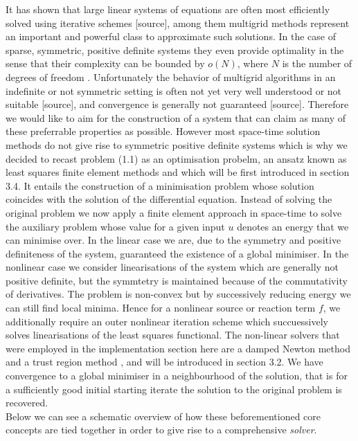 \documentclass[../draft_1.tex]{subfiles}
\begin{document}
It has shown that large linear systems of equations are often most efficiently solved using iterative schemes [source], among them multigrid methods represent an important and powerful class to approximate such solutions. In the case of sparse, symmetric, positive definite systems they even provide optimality in the sense that their complexity can be bounded by $o(N)$, where $N$ is the number of degrees of freedom \cite{brandt1977multi}. Unfortunately the behavior of multigrid algorithms in an indefinite or not symmetric setting is often not yet very well understood or not suitable [source], and convergence is generally not guaranteed [source]. Therefore we would like to aim for the construction of a system that can claim as many of these preferrable properties as possible. However most space-time solution methods do not give rise to symmetric positive definite systems \cite{gander201550} which is why we decided to recast problem (1.1) as an optimisation probelm, an ansatz known as least squares finite element methods \cite{bochev2009least} and which will be first introduced in section 3.4. It entails the construction of a minimisation problem whose solution coincides with the solution of the differential equation. Instead of solving the original problem we now apply a finite element approach in space-time to solve the auxiliary problem whose value for a given input $u$ denotes an energy that we can minimise over. In the linear case we are, due to the symmetry and positive definiteness of the system, guaranteed the existence of a global minimiser. In the nonlinear case we consider linearisations of the system which are generally not positive definite, but the symmtetry is maintained because of the commutativity of derivatives. The problem is non-convex but by successively reducing energy we can still find local minima. Hence for a nonlinear source or reaction term $f$, we additionally require an outer nonlinear iteration scheme which succuessively solves linearisations of the least squares functional. The non-linear solvers that were employed in the implementation section here are a damped Newton method \cite{deuflhard2011newton} and a trust region method \cite{conn2000trust}, and will be introduced in section 3.2. We have convergence to a global minimiser in a neighbourhood of the solution, that is for a sufficiently good initial starting iterate the solution to the original problem is recovered.
\smallskip
\\
Below we can see a schematic overview of how these beforementioned core concepts are tied together in order to give rise to a comprehensive \textit{solver}.
\end{document}
